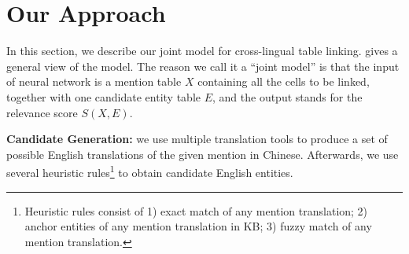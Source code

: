 \section{Our Approach}
\label{sec:approach}



In this section, we describe our joint model for cross-lingual table linking.
 gives a general view of the model.
The reason we call it a ``joint model'' is that
the input of neural network is a mention table $X$ containing all the cells to be linked,
together with one candidate entity table $E$,
and the output stands for the relevance score $S(X, E)$.



\noindent
\textbf{Candidate Generation:}
we use multiple translation tools to produce a set of possible English translations of the given mention in Chinese.
Afterwards, we use several heuristic rules\footnote{{\scriptsize Heuristic rules consist of 1) exact match of any mention translation; 2) anchor entities of any mention translation in KB; 3) fuzzy match of any mention translation. }} to obtain candidate English entities.

